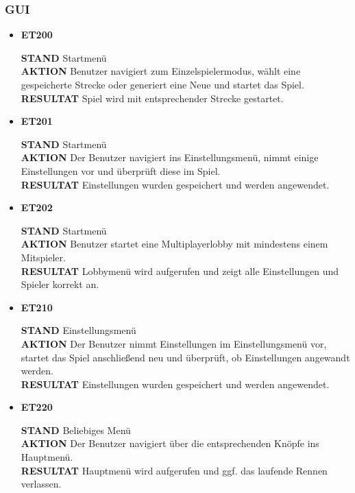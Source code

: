 \documentclass[parskip=full]{scrartcl}
\begin{document}
	\subsubsection{GUI}
		\begin{itemize} [label={}]
			
		\item \textbf{ET200}\par
			\textbf{STAND} Startmenü\\ 
			\textbf{AKTION} Benutzer navigiert zum Einzelspielermodus, wählt eine gespeicherte Strecke oder generiert eine Neue und startet das Spiel.\\
			\textbf{RESULTAT} Spiel wird mit entsprechender Strecke gestartet.\\\par	
		
		\item \textbf{ET201}\par
			\textbf{STAND} Startmenü\\ 
			\textbf{AKTION} Der Benutzer navigiert ins Einstellungsmenü, nimmt einige Einstellungen vor und überprüft diese im Spiel.\\
			\textbf{RESULTAT} Einstellungen wurden gespeichert und werden angewendet.\\\par
		
		\item \textbf{ET202}\par
			\textbf{STAND} Startmenü\\ 
			\textbf{AKTION} Benutzer startet eine Multiplayerlobby mit mindestens einem Mitspieler.\\
			\textbf{RESULTAT} Lobbymenü wird aufgerufen und zeigt alle Einstellungen und Spieler korrekt an.\\\par
		
		\item \textbf{ET210}\par
			\textbf{STAND} Einstellungsmenü\\ 
			\textbf{AKTION} Der Benutzer nimmt Einstellungen im Einstellungsmenü vor, startet das Spiel anschließend neu und überprüft, ob Einstellungen angewandt werden.\\
			\textbf{RESULTAT} Einstellungen wurden gespeichert und werden angewendet.\\\par
			
		\item \textbf{ET220}\par
			\textbf{STAND} Beliebiges Menü\\
			\textbf{AKTION} Der Benutzer navigiert über die entsprechenden Knöpfe ins Hauptmenü.\\
			\textbf{RESULTAT} Hauptmenü wird aufgerufen und ggf. das laufende Rennen verlassen.\\\par
		

\end{itemize}
\end{document}
